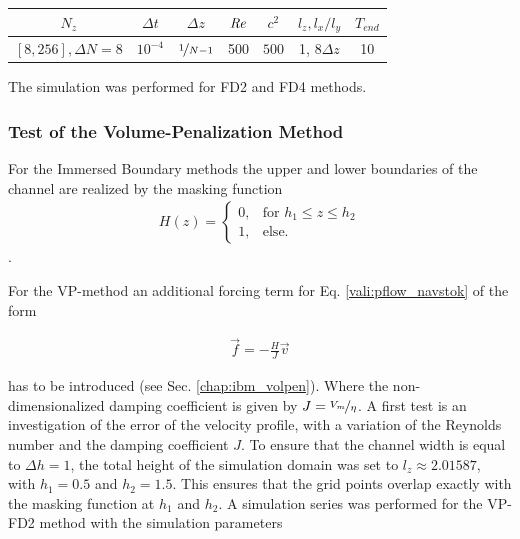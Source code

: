 \begin{center}
\vspace*{0.7ex}
\begin{tabular}{c|c|c|c|c|c|c }
 $ N_z  $                   & $\Delta t$ & $\Delta z$            & $\mbox{\textit{Re}}$  & $c^2$   & $l_z, l_x/l_y$ & $T_{end}$\\
\hline
 $[8, 256], \Delta N = 8 $& $10^{-4}$ & $\nicefrac{1}{N - 1}$ & 500     & $500$   &  1, 8$\Delta z$ &  10\\
\end{tabular}
\vspace*{0.7ex}
\end{center}

The simulation was performed for FD2 and FD4 methods.

\subsubsection{Test of the Volume-Penalization Method}


For the Immersed Boundary methods the upper and lower boundaries of the channel are realized by the masking function
\begin{align}
H(z) = \begin{cases}
                    0, & \text{for \  }  h_1 \leq z \leq h_2 \\
                    1, & \text{else}.
             \end{cases}
\end{align}.

For the VP-method an additional forcing term for Eq. \ref{vali:pflow_navstok} of the form

\begin{align}
    \vec{f} = -\frac{H}{J}\vec{v}
\end{align}

has to be introduced (see Sec. \ref{chap:ibm_volpen}).
Where the non-dimensionalized damping coefficient is given by $J = \nicefrac{V_{m}}{\eta}$.
A first test is an investigation of the error of the velocity profile, with a variation of the Reynolds number and the damping coefficient $J$.
To ensure that the channel width is equal to $\Delta h = 1$, the total height of the simulation domain was set to $l_z\approx2.01587$,
with $h_1=0.5$ and $h_2=1.5$.
This ensures that the grid points overlap exactly with the masking function at $h_1$ and $h_2$.
A simulation series was performed for the VP-FD2 method with the simulation parameters

